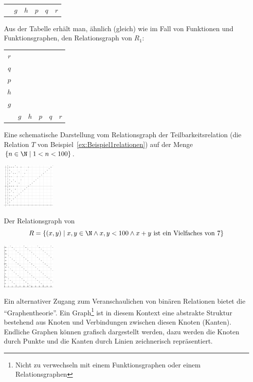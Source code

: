 \begin{bsp}
\begin{center}
\begin{tabular}{ c | c c c c c }
\hline
&$g$&$h$&$p$&$q$&$r$
\end{tabular}
\end{center}
Aus der Tabelle erhält man, ähnlich (gleich) wie im Fall von Funktionen und
Funktionsgraphen, den Relationsgraph von $R_1$:
\begin{center}
\begin{tabular}{ c | c c c c c }
$r$&&&&&\cellcolor{black}\\
$q$&&&\cellcolor{black}&\cellcolor{black}&\\
$p$&&&\cellcolor{black}&\cellcolor{black}&\\
$h$&\cellcolor{black}&\cellcolor{black}&&&\\
$g$&\cellcolor{black}&\cellcolor{black}&&&\\
\hline
&$g$&$h$&$p$&$q$&$r$
\end{tabular}
\end{center}
\end{bsp}

\begin{bsp}
Eine schematische Darstellung vom Relationsgraph der Teilbarkeitsrelation (die Relation
$T$ von Beispiel~\ref{ex:Beispiel1relationen}) auf der Menge $\{n\in\N\mid 1<n<100 \}$.
\begin{center}
\includegraphics[width=0.2\textwidth]{figures/teiler}
\end{center}
Der Relationsgraph von
\[
R=\{(x,y)\mid x,y\in\N\land x,y<100\land x+y\text{ ist ein Vielfaches von }7 \}
\]
\begin{center}
\includegraphics[width=0.2\textwidth]{figures/sum_modulo}
\end{center}
\end{bsp}

Ein alternativer Zugang zum Veranschaulichen von binären Relationen bietet die ``Graphentheorie''. Ein Graph\footnote{Nicht zu verwechseln mit einem Funktionsgraphen oder einem
Relationsgraphen} ist in diesem Kontext eine abstrakte Struktur bestehend aus Knoten und Verbindungen zwischen diesen Knoten (Kanten). Endliche Graphen können grafisch dargestellt werden, dazu werden die Knoten durch Punkte und die Kanten durch Linien zeichnerisch repräsentiert.

